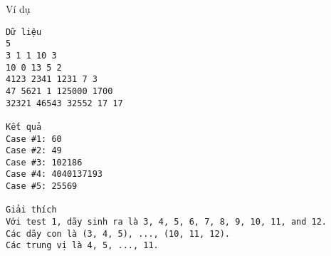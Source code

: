 Ví dụ
\begin{verbatim}
Dữ liệu
5
3 1 1 10 3
10 0 13 5 2
4123 2341 1231 7 3
47 5621 1 125000 1700
32321 46543 32552 17 17

Kết quả
Case #1: 60
Case #2: 49
Case #3: 102186
Case #4: 4040137193
Case #5: 25569

Giải thích
Với test 1, dãy sinh ra là 3, 4, 5, 6, 7, 8, 9, 10, 11, and 12.
Các dãy con là (3, 4, 5), ..., (10, 11, 12).
Các trung vị là 4, 5, ..., 11.
\end{verbatim}